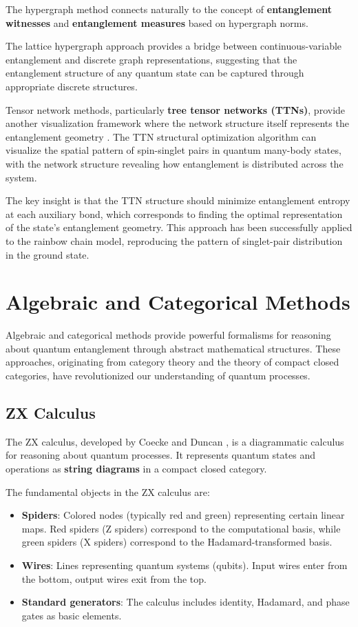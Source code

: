 \documentclass[12pt,a4paper]{article}
\begin{document}
The hypergraph method connects naturally to the concept of \textbf{entanglement witnesses} and \textbf{entanglement measures} based on hypergraph norms.

The lattice hypergraph approach provides a bridge between continuous-variable entanglement and discrete graph representations, suggesting that the entanglement structure of any quantum state can be captured through appropriate discrete structures.

Tensor network methods, particularly \textbf{tree tensor networks (TTNs)}, provide another visualization framework where the network structure itself represents the entanglement geometry \cite{Hikihara2024}. The TTN structural optimization algorithm can visualize the spatial pattern of spin-singlet pairs in quantum many-body states, with the network structure revealing how entanglement is distributed across the system.

The key insight is that the TTN structure should minimize entanglement entropy at each auxiliary bond, which corresponds to finding the optimal representation of the state's entanglement geometry. This approach has been successfully applied to the rainbow chain model, reproducing the pattern of singlet-pair distribution in the ground state.

\section{Algebraic and Categorical Methods}
\label{sec:algebraic}

Algebraic and categorical methods provide powerful formalisms for reasoning about quantum entanglement through abstract mathematical structures. These approaches, originating from category theory and the theory of compact closed categories, have revolutionized our understanding of quantum processes.

\subsection{ZX Calculus}
\label{sec:zx}

The ZX calculus, developed by Coecke and Duncan \cite{cqm,coecke2008interacting,zx-calculus}, is a diagrammatic calculus for reasoning about quantum processes. It represents quantum states and operations as \textbf{string diagrams} in a compact closed category.

The fundamental objects in the ZX calculus are:
\begin{itemize}
	\item \textbf{Spiders}: Colored nodes (typically red and green) representing certain linear maps. Red spiders (Z spiders) correspond to the computational basis, while green spiders (X spiders) correspond to the Hadamard-transformed basis.
	\item \textbf{Wires}: Lines representing quantum systems (qubits). Input wires enter from the bottom, output wires exit from the top.
	\item \textbf{Standard generators}: The calculus includes identity, Hadamard, and phase gates as basic elements.
\end{itemize}
\end{document}
